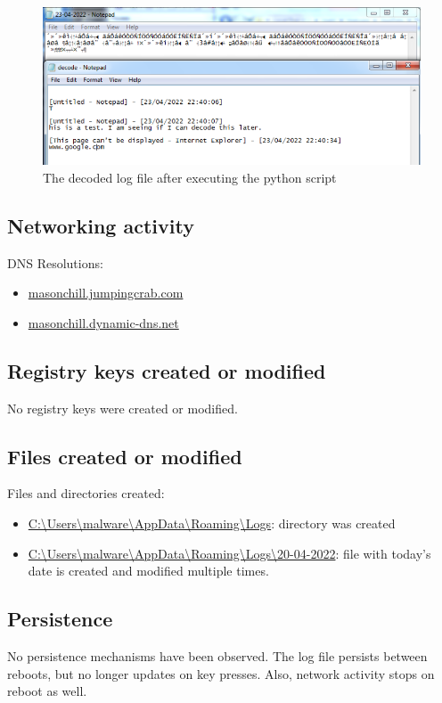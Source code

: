 \documentclass{article}
\begin{document}
    \begin{figure}[H]
        \includegraphics[width=\textwidth]{decoded-logs2.png}
        \caption{The decoded log file after executing the python script}
    \end{figure}
    \subsection{Networking activity}
    DNS Resolutions:
    \begin{itemize}
        \item \url{masonchill.jumpingcrab.com}
        \item \url{masonchill.dynamic-dns.net}
    \end{itemize}
    \subsection{Registry keys created or modified}
    No registry keys were created or modified.
    \subsection{Files created or modified}
    Files and directories created:
    \begin{itemize}
        \item \url{C:\Users\malware\AppData\Roaming\Logs}: directory was created
        \item \url{C:\Users\malware\AppData\Roaming\Logs\20-04-2022}: file with today's date is created and modified multiple times.
    \end{itemize}
    \subsection{Persistence}
    No persistence mechanisms have been observed. The log file persists between reboots, but no longer updates on key presses. Also, network activity stops on reboot as well.
    \pagebreak
\end{document}
